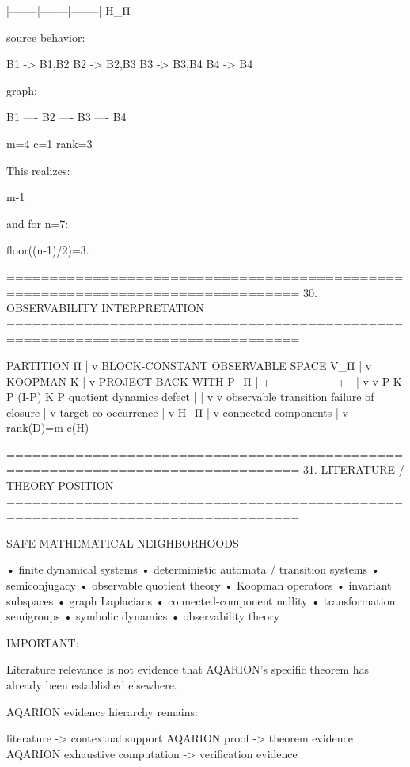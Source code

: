  |--------|--------|--------|
          H_Π

source behavior:

B1 -> {B1,B2}
B2 -> {B2,B3}
B3 -> {B3,B4}
B4 -> {B4}

graph:

B1 ---- B2 ---- B3 ---- B4

m=4
c=1
rank=3

This realizes:

m-1

and for n=7:

floor((n-1)/2)=3.

================================================================================
30. OBSERVABILITY INTERPRETATION
================================================================================

PARTITION Π
     |
     v
BLOCK-CONSTANT OBSERVABLE SPACE V_Π
     |
     v
KOOPMAN K
     |
     v
PROJECT BACK WITH P_Π
     |
     +------------------+
     |                  |
     v                  v
P K P                (I-P) K P
quotient dynamics       defect
     |                  |
     v                  v
observable transition   failure of closure
                        |
                        v
                  target co-occurrence
                        |
                        v
                      H_Π
                        |
                        v
                  connected components
                        |
                        v
                  rank(D)=m-c(H)

================================================================================
31. LITERATURE / THEORY POSITION
================================================================================

SAFE MATHEMATICAL NEIGHBORHOODS

  • finite dynamical systems
  • deterministic automata / transition systems
  • semiconjugacy
  • observable quotient theory
  • Koopman operators
  • invariant subspaces
  • graph Laplacians
  • connected-component nullity
  • transformation semigroups
  • symbolic dynamics
  • observability theory

IMPORTANT:

Literature relevance is not evidence that AQARION's specific theorem has
already been established elsewhere.

AQARION evidence hierarchy remains:

literature -> contextual support
AQARION proof -> theorem evidence
AQARION exhaustive computation -> verification evidence

